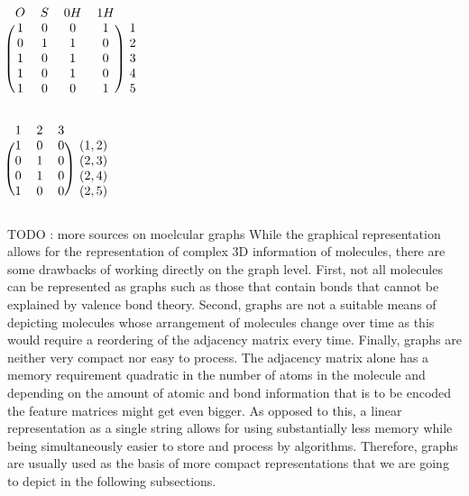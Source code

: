 \begin{minipage}{0.45\textwidth}
	\centering
	$
	\begin{blockarray}{ccccc}
	O & S & 0H & 1H  \\
	\begin{block}{(cccc)c}
	1 & 0 & 0 & 1 &  1 \\
	0 & 1 & 1 & 0 & 2 \\
	1 & 0 & 1 & 0 &  3 \\
	1 & 0 & 1 & 0 &  4 \\
	1 & 0 & 0 & 1 &  5 \\
	\end{block}
	\end{blockarray}
	$
	\label{fig:mol_node_feature_matrix}
\end{minipage}
\hfill
\begin{minipage}{0.45\textwidth}
	\vspace{.1cm}
	\centering
	$
	\begin{blockarray}{cccc}
	1 & 2 & 3  \\
	\begin{block}{(ccc)c}
	1 & 0 & 0 &  (1,2) \\
	0 & 1 & 0 &  (2,3) \\
	0 & 1 & 0 &  (2,4) \\
	1 & 0 & 0 &  (2,5) \\
	\end{block}
	\end{blockarray}
	$
	\label{fig:mol_edge_feature_matrix}
\end{minipage}
\newline\newline
TODO : more sources on moelcular graphs 
While the graphical representation allows for the representation of complex 3D information of molecules, there are some drawbacks of working directly on the graph level. First, not all molecules can be represented as graphs \citep{molrep} such as those that contain bonds that cannot be explained by valence bond theory. Second, graphs are not a suitable means of depicting molecules whose arrangement of molecules change over time as this would require a reordering of the adjacency matrix every time. Finally, graphs are neither very compact nor easy to process. The adjacency matrix alone has a memory requirement quadratic in the number of atoms in the molecule and depending on the amount of atomic and bond information that is to be encoded the feature matrices might get even bigger. As opposed to this, a linear representation as a single string allows for using substantially less memory while being simultaneously easier to store and process by algorithms. Therefore, graphs are usually used as the basis of more compact representations that we are going to depict in the following subsections. 
